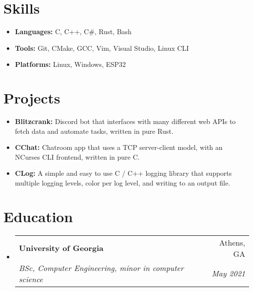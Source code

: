 \documentclass[letterpaper,11pt]{article}
\makeatletter
\newcommand{\resumeSubheading}[4]{
  \vspace{-1pt}\item
    \begin{tabular*}{0.97\textwidth}{l@{\extracolsep{\fill}}r}
      \textbf{#1} & #2 \\
      \textit{\small#3} & \textit{\small #4} \\
    \end{tabular*}\vspace{-5pt}
}
\newcommand{\resumeSubHeadingListStart}{\begin{itemize}[leftmargin=*]}
\newcommand{\resumeSubHeadingListEnd}{\end{itemize}}
\makeatother
\begin{document}
\section{Skills}
\begin{itemize}
\setlength\itemsep{0em}
\item
\textbf{Languages:} C, C++, C\#, Rust, Bash
\item
\textbf{Tools:} Git, CMake, GCC, Vim, Visual Studio, Linux CLI
\item
\textbf{Platforms:} Linux, Windows, ESP32
\end{itemize}
\section{Projects}
\begin{itemize}
\setlength\itemsep{0em}
\item 
\textbf{Blitzcrank:} Discord bot that interfaces with many different web APIs to fetch data and automate tasks, written in pure Rust.
\item
\textbf{CChat:} Chatroom app that uses a TCP server-client model, with an NCurses CLI frontend, written in pure C.
\item
\textbf{CLog:} A simple and easy to use C / C++ logging library that supports multiple logging levels, color per log level, and writing to an output file. \\
\end{itemize}

\section{Education}
  \resumeSubHeadingListStart
    \resumeSubheading
      {University of Georgia}{Athens, GA}
      {BSc, Computer Engineering, minor in computer science}{May 2021 }
  \resumeSubHeadingListEnd
\end{document}
